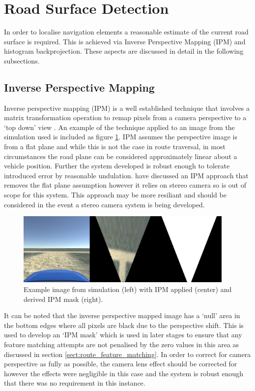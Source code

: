 \documentclass[]{aiaa-tc}%
\begin{document}
\section{Road Surface Detection}

In order to localise navigation elements a reasonable estimate of the current road surface is required. This is achieved via Inverse Perspective Mapping (IPM) and histogram backprojection. These aspects are discussed in detail in the following subsections.

\subsection{Inverse Perspective Mapping}\label{s:ipm}

Inverse perspective mapping (IPM) is a well established technique that involves a matrix transformation operation to remap pixels from a camera perspective to a `top down' view \citep{compVisionTextbook}. An example of the technique applied to an image from the simulation used is included as figure \ref{f:ipmSim}. IPM assumes the perspective image is from a flat plane \citep{ipmForLaneTracking} and while this is not the case in route traversal, in most circumstances the road plane can be considered approximately linear about a vehicle position. Further the system developed is robust enough to tolerate introduced error by reasonable undulation. \citep{extendedIPM} have discussed an IPM approach that removes the flat plane assumption however it relies on stereo camera so is out of scope for this system. This approach may be more resiliant and should be considered in the event a stereo camera system is being developed.


\begin{figure}
	\centering
	\includegraphics[width=0.95\textwidth]{RoadDetection/ipmSim.png}
	\caption{Example image from simulation (left) with IPM applied (center) and derived IPM mask (right).}
	\label{f:ipmSim}
\end{figure}

It can be noted that the inverse perspective mapped image has a `null' area in the bottom edges where all pixels are black due to the perspective shift. This is used to develop an `IPM mask' which is used in later stages to ensure that any feature matching attempts are not penalised by the zero values in this area as discussed in section \ref{sect:route_feature_matching}. In order to correct for camera perspective as fully as possible, the camera lens effect should be corrected for \citep{fisheyeEffect} however the effects were negligible in this case and the system is robust enough that there was no requirement in this instance.
\end{document}
